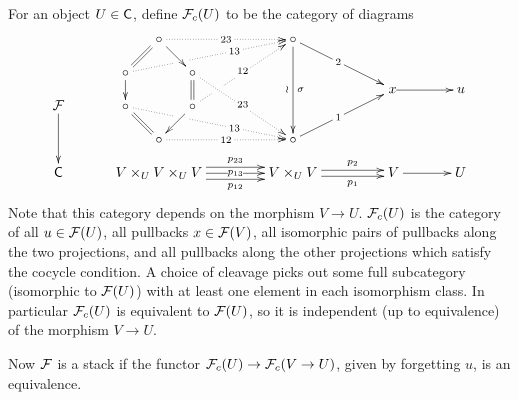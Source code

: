 \begin{remark}
   For an object $U\in \text{\sf C}$, define $\mathcal{F}_c(U)$ to be the category of diagrams
   \[\xymatrix@!0{
     & & & \circ \ar@{.>}[rrrr]|{\;23\;} \ar[dr] & & & &
        \circ \ar[ddd]^\sigma_\wr \ar p+<5.4pc,-2.7pc>|{\;2\;}\\
    & & \circ \ar@{.>}[rrrrru]|!{[ru];[rr]}{\hole\hole}|(.65){\;13\;}
    \ar@{=}[ur] \ar[d] & &
        \circ \ar@{.>}[rrrdd]|{\hole 23\hole} \ar@{=}[d]\\
    \F \ar[dd]& & \circ \ar@{.>}[rrrrrd]|!{[rd];[rr]}{\hole\hole}|(.65){\;13\;}
        \ar@{=}[dr] & &
        \circ \ar@{.>}[rrruu]|!{[u];[drrr]}{\hole\hole}|{\hole 12\hole} \ar[dl]\\
    & & & \circ \ar@{.>}[rrrr]|{\;12\;} & & & &
        \circ \ar p+<5.4pc,2.7pc>|{\;1\;}|(1.1){\txt{$x$}}="x"\\
    \C& & & V\times_U V\times_U V
        \ar@<1ex>[rrrr]^<>(.5){p_{23}}
        \ar[rrrr]|<>(.5){p_{13}}
        \ar@<-1ex>[rrrr]_<>(.5){p_{12}}
      & & & & V\times_U V
        \ar@<.5ex>[rrr]^<>(.5){p_2}\ar@<-.5ex>[rrr]_<>(.5){p_1}
      & & & V \ar[rr] & & U
      \ar|(1.1){\txt{$\;u$}} "x";"x"+<3.6pc,0pc>
   }\]
    Note that this category depends on
   the morphism $V\to U$. $\mathcal{F}_c(U)$ is the category of all $u\in \mathcal{F}(U)$, all pullbacks
   $x\in \mathcal{F}(V)$, all isomorphic pairs of pullbacks along the two projections, and all
   pullbacks along the other projections which satisfy the cocycle condition. A choice
   of cleavage picks out some full subcategory (isomorphic to $\mathcal{F}(U)$) with at least one
   element in each isomorphism class. In particular $\mathcal{F}_c(U)$ is equivalent to $\mathcal{F}(U)$,
   so it is independent (up to equivalence) of the morphism $V\to U$.

   Now $\mathcal{F}$ is a stack if the functor $\mathcal{F}_c(U)\to \mathcal{F}_c(V\to U)$, given by forgetting $u$,
   is an equivalence.
 \end{remark}

